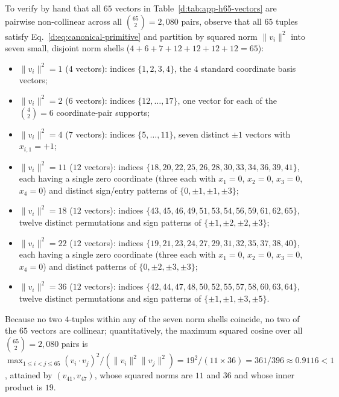 \documentclass[aps,pra,reprint,superscriptaddress,longbibliography,nofootinbib,floatfix,10pt]{revtex4-2}
\theoremstyle{definition}
\begin{document}
To verify by hand that all $65$ vectors in Table~\ref{d:tab:app-h65-vectors} are pairwise non-collinear across all $\binom{65}{2}=2{,}080$ pairs, observe that all $65$ tuples satisfy Eq.~\eqref{d:eq:canonical-primitive} and partition by squared norm $\|v_i\|^2$ into seven small, disjoint norm shells ($4+6+7+12+12+12+12=65$):
\begin{itemize}
\item $\|v_i\|^2=1$ ($4$ vectors): indices $\{1,2,3,4\}$, the $4$ standard coordinate basis vectors;
\item $\|v_i\|^2=2$ ($6$ vectors): indices $\{12,\ldots,17\}$, one vector for each of the $\binom{4}{2}=6$ coordinate-pair supports;
\item $\|v_i\|^2=4$ ($7$ vectors): indices $\{5,\ldots,11\}$, seven distinct $\pm1$ vectors with $x_{i,1}=+1$;
\item $\|v_i\|^2=11$ ($12$ vectors): indices $\{18,20,22,25,26,28,30,33,34,36,39,41\}$, each having a single zero coordinate (three each with $x_1=0$, $x_2=0$, $x_3=0$, $x_4=0$) and distinct sign/entry patterns of $\{0,\pm1,\pm1,\pm3\}$;
\item $\|v_i\|^2=18$ ($12$ vectors): indices $\{43,45,46,49,51,53,54,56,59,61,62,65\}$, twelve distinct permutations and sign patterns of $\{\pm1,\pm2,\pm2,\pm3\}$;
\item $\|v_i\|^2=22$ ($12$ vectors): indices $\{19,21,23,24,27,29,31,32,35,37,38,40\}$, each having a single zero coordinate (three each with $x_1=0$, $x_2=0$, $x_3=0$, $x_4=0$) and distinct patterns of $\{0,\pm2,\pm3,\pm3\}$;
\item $\|v_i\|^2=36$ ($12$ vectors): indices $\{42,44,47,48,50,52,55,57,58,60,63,64\}$, twelve distinct permutations and sign patterns of $\{\pm1,\pm1,\pm3,\pm5\}$.
\end{itemize}
Because no two $4$-tuples within any of the seven norm shells coincide, no two of the $65$ vectors are collinear; quantitatively, the maximum squared cosine over all $\binom{65}{2}=2{,}080$ pairs is $\max_{1\le i<j\le 65}(v_i\cdot v_j)^2/(\|v_i\|^2\|v_j\|^2)=19^2/(11\times 36)=361/396\approx 0.9116<1$, attained by $(v_{41},v_{47})$, whose squared norms are $11$ and $36$ and whose inner product is $19$.
\end{document}

